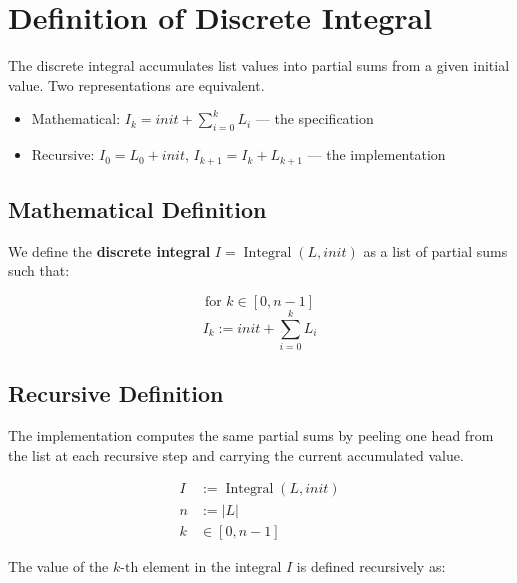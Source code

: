 \section{Definition of Discrete Integral}
\label{sec:definition}

The discrete integral accumulates list values into partial sums from a
given initial value. Two representations are equivalent.

\begin{itemize}
  \item Mathematical: $I_k = init + \sum_{i=0}^k L_i$ --- the
    specification
  \item Recursive: $I_0 = L_0 + init$, $I_{k+1} = I_k + L_{k+1}$ --- the
    implementation
\end{itemize}

\subsection{Mathematical Definition}
\label{sec:mathematical-definition}

We define the \textbf{discrete integral} $I = \operatorname{Integral}(L,
init)$ as a list of partial sums such that:

\begin{equation*}
\text{for } k \in [0, n - 1]
\end{equation*}
\begin{equation*}
I_{k} := init + \sum_{i=0}^{k} L_i
\end{equation*}

\subsection{Recursive Definition}
\label{sec:recursive-definition}

The implementation computes the same partial sums by peeling one head from
the list at each recursive step and carrying the current accumulated
value.

\begin{equation*}
\begin{aligned}
I &:= \operatorname{Integral}(L, init) \\
n &:= \lvert L\rvert \\
k &\in [0, n - 1]
\end{aligned}
\end{equation*}

The value of the $k\text{-th}$ element in the integral $I$ is defined
recursively as:


